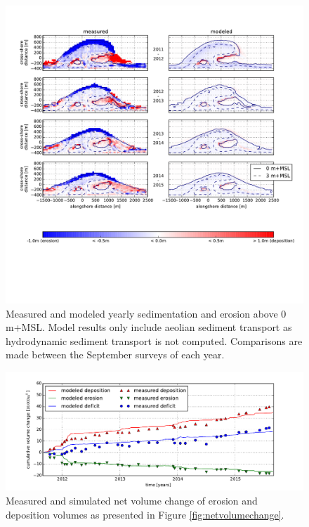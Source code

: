 \begin{figure}
  \centering
  \includegraphics[width=1.2\columnwidth, angle=90]{../Figures/model_sedero}
  \caption{Measured and modeled yearly sedimentation and erosion
    above 0 m+MSL. Model results only include aeolian sediment
    transport as hydrodynamic sediment transport is not
    computed. Comparisons are made between the September surveys of
    each year.}
  \label{fig:sedero_model}
\end{figure}

\begin{figure}
  \centering
\includegraphics[width=\columnwidth]{../Figures/model_volumes_ts}
\caption{Measured and simulated net volume change of erosion and
  deposition volumes as presented in Figure
  \ref{fig:netvolumechange}.}
  \label{fig:netvolumechange_model}
\end{figure}

